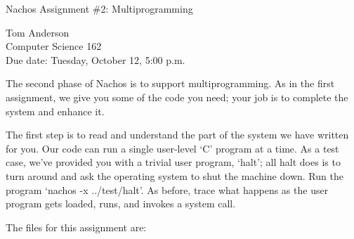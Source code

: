 


\begin{center}
{\large Nachos Assignment \#2: Multiprogramming

\vspace{.2in}
Tom Anderson\\
Computer Science 162\\
Due date: Tuesday, October 12, 5:00 p.m.
}
\end{center}

\vspace{.2in}

The second phase of Nachos is to support multiprogramming.
As in the first assignment, we give you some of the code
you need; your job is to complete the system and enhance it.

The first step is to read and understand the part of the system
we have written for you.  Our code can run a single user-level `C'
program at a time.  As a test case, we've provided you with
a trivial user program, `halt'; all halt does is to turn around
and ask the operating system to shut the
machine down.  Run the program `nachos -x ../test/halt'.
As before, trace what happens as the user program
gets loaded, runs, and invokes a system call.

The files for this assignment are:

